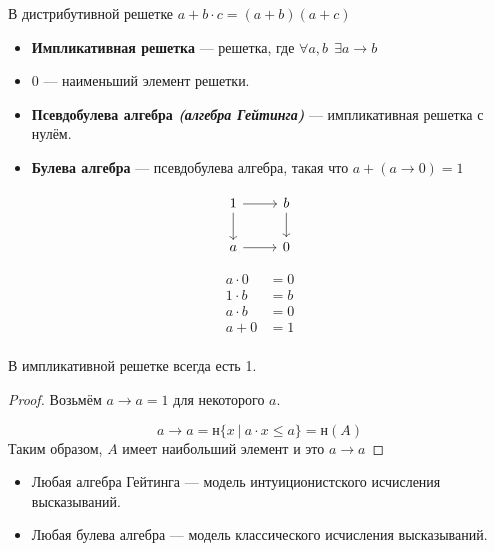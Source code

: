 \documentclass[12pt, a4paper, oneside]{book}
\begin{document}
\begin{lemma}
    В дистрибутивной решетке \(a + b\cdot c = (a + b)(a + c)\)
\end{lemma}

\begin{definition}\itemfix
    \begin{itemize}
        \item \textbf{Импликативная решетка} --- решетка, где \(\forall a, b \ \ \exists a \to b\)
        \item \(0\) --- наименьший элемент решетки.
        \item \textbf{Псевдобулева алгебра \textit{(алгебра Гейтинга)}} --- импликативная решетка с нулём.
        \item \textbf{Булева алгебра} --- псевдобулева алгебра, такая что \(a + (a \to 0) = 1\)
    \end{itemize}
\end{definition}

\begin{example}
    $$\begin{tikzcd}[ampersand replacement=\&]
            1 \arrow{r} \arrow[swap]{d}{} \& b \arrow{d}{} \\
            a \arrow{r} \& 0
        \end{tikzcd}$$

    \begin{align*}
        a\cdot 0 & = 0 \\
        1\cdot b & = b \\
        a\cdot b & = 0 \\
        a + 0    & = 1 \\
    \end{align*}
\end{example}

\begin{lemma}
    В импликативной решетке всегда есть 1.
\end{lemma}
\begin{proof}
    Возьмём \(a \to a = 1\) для некоторого \(a\).

    \[a \to a = \text{н} \{x\ |\ a\cdot x \leq a\} = \text{н}(A)\]
    Таким образом, \(A\) имеет наибольший элемент и это \(a \to a\)
\end{proof}

\begin{theorem}\itemfix
    \begin{itemize}
        \item Любая алгебра Гейтинга --- модель интуиционистского исчисления высказываний.
        \item Любая булева алгебра --- модель классического исчисления высказываний.
    \end{itemize}
\end{theorem}
\end{document}
